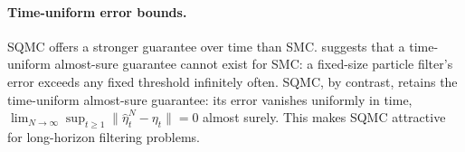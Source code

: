
\paragraph{Time-uniform error bounds.}

SQMC offers a stronger guarantee over time than SMC. \citet{gerber2026} suggests that a time-uniform almost-sure guarantee cannot exist for SMC: a fixed-size particle filter's error exceeds any fixed threshold infinitely often. SQMC, by contrast, retains the time-uniform almost-sure guarantee: its error vanishes uniformly in time, $\lim_{N\to\infty}\sup_{t\ge 1}\|\hat\eta_t^N - \eta_t\| = 0$ almost surely. This makes SQMC attractive for long-horizon filtering problems.


